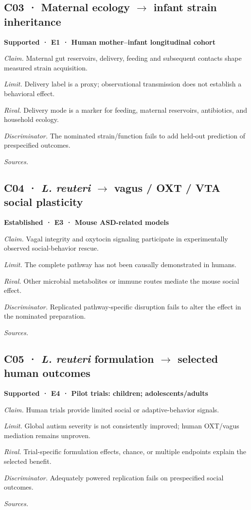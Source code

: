 \subsection*{C03 · Maternal ecology \ensuremath{\rightarrow} infant strain inheritance}
\noindent\textbf{Supported · E1 · Human mother–infant longitudinal cohort}\par
\textit{Claim.} Maternal gut reservoirs, delivery, feeding and subsequent contacts shape measured strain acquisition.\par
\textit{Limit.} Delivery label is a proxy; observational transmission does not establish a behavioral effect.\par
\textit{Rival.} Delivery mode is a marker for feeding, maternal reservoirs, antibiotics, and household ecology.\par
\textit{Discriminator.} The nominated strain/function fails to add held-out prediction of prespecified outcomes.\par
\textit{Sources.} \cite{ref3}\par
\subsection*{C04 · \emph{L. reuteri} \ensuremath{\rightarrow} vagus / OXT / VTA social plasticity}
\noindent\textbf{Established · E3 · Mouse ASD-related models}\par
\textit{Claim.} Vagal integrity and oxytocin signaling participate in experimentally observed social-behavior rescue.\par
\textit{Limit.} The complete pathway has not been causally demonstrated in humans.\par
\textit{Rival.} Other microbial metabolites or immune routes mediate the mouse social effect.\par
\textit{Discriminator.} Replicated pathway-specific disruption fails to alter the effect in the nominated preparation.\par
\textit{Sources.} \cite{ref4}\par
\subsection*{C05 · \emph{L. reuteri} formulation \ensuremath{\rightarrow} selected human outcomes}
\noindent\textbf{Supported · E4 · Pilot trials: children; adolescents/adults}\par
\textit{Claim.} Human trials provide limited social or adaptive-behavior signals.\par
\textit{Limit.} Global autism severity is not consistently improved; human OXT/vagus mediation remains unproven.\par
\textit{Rival.} Trial-specific formulation effects, chance, or multiple endpoints explain the selected benefit.\par
\textit{Discriminator.} Adequately powered replication fails on prespecified social outcomes.\par
\textit{Sources.} \cite{ref5,ref6}\par
